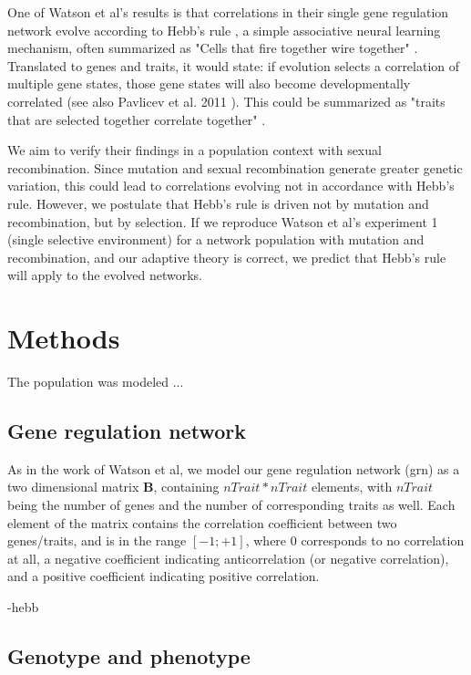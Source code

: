 \documentclass{article}
\begin{document}
One of Watson et al's results is that correlations in their single gene regulation network evolve according to Hebb’s rule \cite{hebb}, a simple associative neural learning mechanism, often summarized as "Cells that fire together wire together" \cite{shatz1992}.
Translated to genes and traits, it would state: if evolution selects a correlation of multiple gene states, those gene states will also become developmentally correlated (see also Pavlicev et al. 2011 \cite{pavlicev2011}).
This could be summarized as "traits that are selected together correlate together" \cite{watson2014}.

We aim to verify their findings in a population context with sexual recombination.
Since mutation and sexual recombination generate greater genetic variation, this could lead to correlations evolving not in accordance with Hebb's rule. However, we postulate that Hebb’s rule is driven not by mutation and recombination, but by selection.
If we reproduce Watson et al’s experiment 1 (single selective environment) for a network population with mutation and recombination, and our adaptive theory is correct, we predict that Hebb’s rule will apply to the evolved networks.

\section{Methods}

The population was modeled ...

\subsection{Gene regulation network}

As in the work of Watson et al, we model our gene regulation network (grn) as a two dimensional matrix $\bm{B}$, containing $nTrait * nTrait$ elements, with $nTrait$ being the number of genes and the number of corresponding traits as well.
Each element of the matrix contains the correlation coefficient between two genes/traits, and is in the range $[-1; +1]$, where 0 corresponds to no correlation at all, a negative coefficient indicating anticorrelation (or negative correlation), and a positive coefficient indicating positive correlation.

-hebb

\subsection{Genotype and phenotype}
\end{document}
